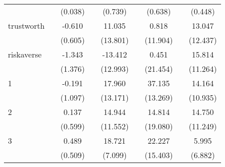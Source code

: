 \begin{table}[htbp]
\begin{tabular}{l*{8}{c}}
                    &                     &     (0.038)         &                     &     (0.739)         &                     &     (0.638)         &                     &     (0.448)         \\
trustworth          &                     &      -0.610         &                     &      11.035         &                     &       0.818         &                     &      13.047         \\
                    &                     &     (0.605)         &                     &    (13.801)         &                     &    (11.904)         &                     &    (12.437)         \\
riskaverse          &                     &      -1.343         &                     &     -13.412         &                     &       0.451         &                     &      15.814         \\
                    &                     &     (1.376)         &                     &    (12.993)         &                     &    (21.454)         &                     &    (11.264)         \\
1                   &                     &      -0.191         &                     &      17.960         &                     &      37.135\sym{**} &                     &      14.164         \\
                    &                     &     (1.097)         &                     &    (13.171)         &                     &    (13.269)         &                     &    (10.935)         \\
2                   &                     &       0.137         &                     &      14.944         &                     &      14.814         &                     &      14.750         \\
                    &                     &     (0.599)         &                     &    (11.552)         &                     &    (19.080)         &                     &    (11.249)         \\
3                   &                     &       0.489         &                     &      18.721\sym{**} &                     &      22.227         &                     &       5.995         \\
                    &                     &     (0.509)         &                     &     (7.099)         &                     &    (15.403)         &                     &     (6.882)         \\

\end{tabular}
\end{table}
